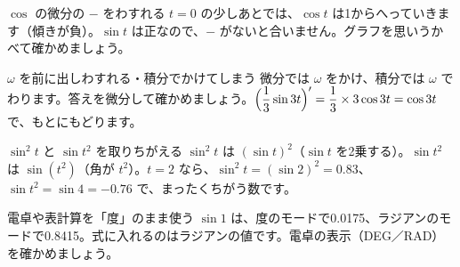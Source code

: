 
\begin{tsumazuki}{$\cos$ の微分の $-$ をわすれる}
$t=0$ の少しあとでは、$\cos t$ は1からへっていきます（傾きが負）。$\sin t$ は正なので、$-$ がないと合いません。グラフを思いうかべて確かめましょう。
\end{tsumazuki}

\begin{tsumazuki}{$\omega$ を前に出しわすれる・積分でかけてしまう}
微分では $\omega$ をかけ、積分では $\omega$ でわります。答えを微分して確かめましょう。$\Bigl(\dfrac{1}{3}\sin3t\Bigr)'=\dfrac{1}{3}\times3\cos3t=\cos3t$ で、もとにもどります。
\end{tsumazuki}

\begin{tsumazuki}{$\sin^2t$ と $\sin t^2$ を取りちがえる}
$\sin^2t$ は $(\sin t)^2$（$\sin t$ を2乗する）。$\sin t^2$ は $\sin(t^2)$（角が $t^2$）。$t=2$ なら、$\sin^2t=(\sin2)^2=0.83$、$\sin t^2=\sin4=-0.76$ で、まったくちがう数です。
\end{tsumazuki}

\begin{tsumazuki}{電卓や表計算を「度」のまま使う}
$\sin1$ は、度のモードで0.0175、ラジアンのモードで0.8415。式に入れるのはラジアンの値です。電卓の表示（DEG／RAD）を確かめましょう。
\end{tsumazuki}

